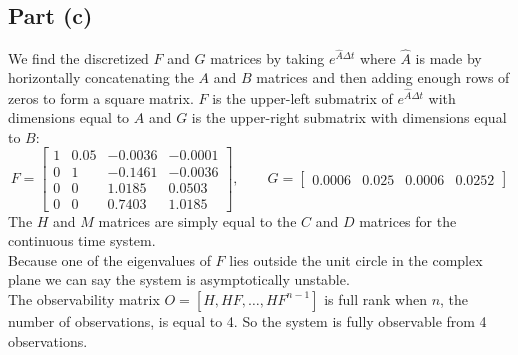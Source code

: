 \documentclass[11pt]{article}
\begin{document}
\subsection*{Part (c)}
We find the discretized $F$ and $G$ matrices by taking $e^{\hat{A}\Delta t}$ where $\hat{A}$ is made by horizontally concatenating the $A$ and $B$ matrices and then adding enough rows of zeros to form a square matrix. $F$ is the upper-left submatrix of $e^{\hat{A}\Delta t}$ with dimensions equal to $A$ and $G$ is the upper-right submatrix with dimensions equal to $B$:
\begin{equation*}
	F = \begin{bmatrix} 1 & 0.05 & -0.0036 & -0.0001 \\
						0 & 1 & -0.1461 & -0.0036 \\
						0 & 0 & 1.0185 & 0.0503 \\
						0 & 0 & 0.7403 & 1.0185 \end{bmatrix},\qquad
	G = \begin{bmatrix} 0.0006 & 0.025 & 0.0006 & 0.0252 \end{bmatrix}
\end{equation*}
The $H$ and $M$ matrices are simply equal to the $C$ and $D$ matrices for the continuous time system. \\
Because one of the eigenvalues of $F$ lies outside the unit circle in the complex plane we can say the system is asymptotically unstable. \\
The observability matrix $O = [H, HF, \dots, HF^{n-1}]$ is full rank when $n$, the number of observations, is equal to 4. So the system is fully observable from 4 observations.
\end{document}
